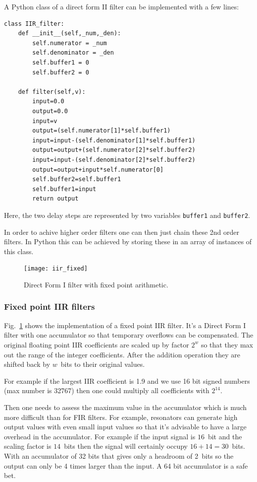 \documentclass[12pt,a4paper]{article}
\begin{document}
A Python class of a direct form II filter can be implemented
with a few lines:
\begin{verbatim}
class IIR_filter:
    def __init__(self,_num,_den):
        self.numerator = _num
        self.denominator = _den
        self.buffer1 = 0
        self.buffer2 = 0

    def filter(self,v):
        input=0.0
        output=0.0
        input=v
        output=(self.numerator[1]*self.buffer1)
        input=input-(self.denominator[1]*self.buffer1)
        output=output+(self.numerator[2]*self.buffer2)
        input=input-(self.denominator[2]*self.buffer2)
        output=output+input*self.numerator[0]
        self.buffer2=self.buffer1
        self.buffer1=input
        return output
\end{verbatim}
Here, the two delay steps are represented by two variables
\texttt{buffer1} and \texttt{buffer2}.

In order to achive higher order filters one can then just
chain these 2nd order filters. In Python this can be achieved
by storing these in an array of instances of this class.

\begin{figure}[!hbt]
\begin{center}
\mbox{\texttt{[image: iir\_fixed]}}
\end{center}
\caption{Direct Form I filter with fixed point arithmetic.
\label{iir_fixed}}
\end{figure}


\subsubsection{Fixed point IIR filters}
Fig.~\ref{iir_fixed} shows the implementation of a fixed point IIR
filter. It's a Direct Form I filter with one accumulator so that
temporary overflows can be compensated. The original floating point
IIR coefficients are scaled up by factor $2^w$ so that they max out
the range of the integer coefficients. After the addition operation
they are shifted back by $w$~bits to their original values.

For example if the largest IIR coefficient is 1.9 and we use 16 bit
signed numbers (max number is 32767) then one could multiply all
coefficients with $2^{14}$.

Then one needs to assess the maximum value in the accumulator which
is much more difficult than for FIR filters. For example,
resonators can generate high output values with even small input values
so that it's advisable to have a large overhead in the accumulator.
For example if the input signal is $16$~bit and the scaling factor is
$14$~bits then the signal will certainly occupy $16+14=30$~bits. With
an accumulator of 32 bits that gives only a headroom of 2~bits so the
output can only be 4 times larger than the input. A 64 bit accumulator
is a safe bet.
\end{document}
